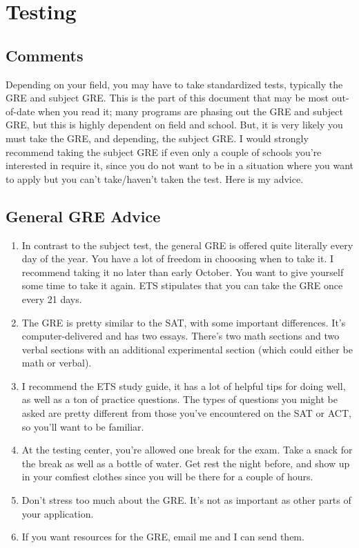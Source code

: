 \documentclass[12pt]{article}
\begin{document}
\section{Testing}
\subsection{Comments}
Depending on your field, you may have to take standardized tests, typically the GRE and subject GRE. This is the part of this document that may be most out-of-date when you read it; many programs are phasing out the GRE and subject GRE, but this is highly dependent on field and school. But, it is very likely you must take the GRE, and depending, the subject GRE. I would strongly recommend taking the subject GRE if even only a couple of schools you're interested in require it, since you do not want to be in a situation where you want to apply but you can't take/haven't taken the test. Here is my advice.
\subsection{General GRE Advice}
\begin{enumerate}
\item In contrast to the subject test, the general GRE is offered quite literally every day of the year. You have a lot of freedom in chooosing when to take it. I recommend taking it no later than early October. You want to give yourself some time to take it again. ETS stipulates that you can take the GRE once every 21 days.

\item The GRE is pretty similar to the SAT, with some important differences. It's computer-delivered and has two essays. There's two math sections and two verbal sections with an additional experimental section (which could either be math or verbal). 

\item I recommend the ETS study guide, it has a lot of helpful tips for doing well, as well as a ton of practice questions. The types of questions you might be asked are pretty different from those you've encountered on the SAT or ACT, so you'll want to be familiar.

\item At the testing center, you're allowed one break for the exam. Take a snack for the break as well as a bottle of water. Get rest the night before, and show up in your comfiest clothes since you will be there for a couple of hours.

\item Don't stress too much about the GRE. It's not as important as other parts of your application.

\item If you want resources for the GRE, email me and I can send them.

\end{enumerate}
\end{document}
